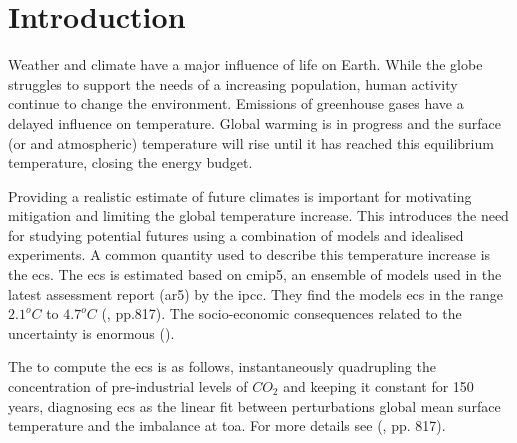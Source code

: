 \chapter{Introduction} \label{ch:introduction}
Weather and climate have a major influence of life on Earth. While the globe struggles to support the needs of a increasing population, human activity continue to change the environment. Emissions of greenhouse gases have a delayed influence on temperature. %
Global warming is in progress and the surface (or and atmospheric) temperature will rise until it has reached this equilibrium temperature, closing the energy budget. 

Providing a realistic estimate of future climates is important for motivating mitigation and limiting the global temperature increase. 
This introduces the need for studying potential futures using a combination of models and idealised experiments. A common quantity used to describe this temperature increase is the \acrfull{ecs}.  The \acrshort{ecs} is estimated based on \acrfull{cmip5}, an ensemble of models used in the latest assessment report (\acrshort{ar5}) by the \acrfull{ipcc}. They find the models \acrshort{ecs} in the range $2.1^oC$ to $4.7^oC$ (\cite{IPCC_CH9_climate_models}, pp.817). %
The socio-economic consequences related to the uncertainty is enormous (\cite{bony2015}). 

The to compute the \acrshort{ecs} is as follows, instantaneously quadrupling the concentration of pre-industrial levels of $CO_2$ and keeping it constant for 150 years, diagnosing \acrshort{ecs} as the linear fit between perturbations global mean surface temperature and the imbalance at \acrfull{toa}. For more details see (\cite{IPCC_CH9_climate_models}, pp. 817). 

